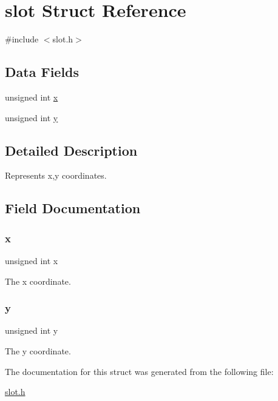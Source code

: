\hypertarget{structslot}{}\section{slot Struct Reference}
\label{structslot}


{\ttfamily \#include $<$slot.\+h$>$}

\subsection*{Data Fields}
\begin{DoxyCompactItemize}
\item 
unsigned int \hyperlink{structslot_a676e0da0ef83bbbdf42538e54b97506b}{x}
\item 
unsigned int \hyperlink{structslot_ac30de26db5f6d1c18c63913729adca7d}{y}
\end{DoxyCompactItemize}


\subsection{Detailed Description}
Represents x,y coordinates. 

\subsection{Field Documentation}
\hypertarget{structslot_a676e0da0ef83bbbdf42538e54b97506b}{}\label{structslot_a676e0da0ef83bbbdf42538e54b97506b} 
\subsubsection{\texorpdfstring{x}{x}}
{\footnotesize\ttfamily unsigned int x}

The x coordinate. \hypertarget{structslot_ac30de26db5f6d1c18c63913729adca7d}{}\label{structslot_ac30de26db5f6d1c18c63913729adca7d} 
\subsubsection{\texorpdfstring{y}{y}}
{\footnotesize\ttfamily unsigned int y}

The y coordinate. 

The documentation for this struct was generated from the following file\+:\begin{DoxyCompactItemize}
\item 
\hyperlink{slot_8h}{slot.\+h}\end{DoxyCompactItemize}
